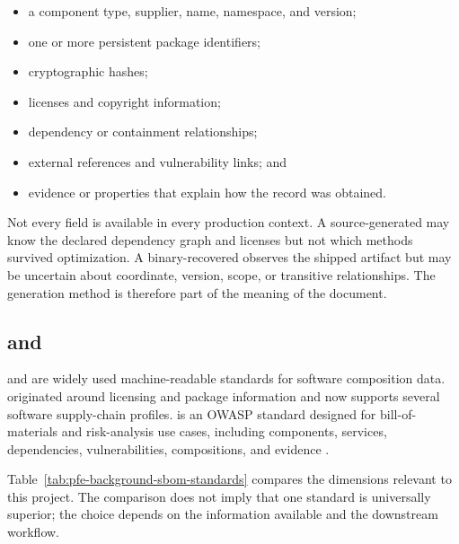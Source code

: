 \begin{itemize}
  \item a component type, supplier, name, namespace, and version;
  \item one or more persistent package identifiers;
  \item cryptographic hashes;
  \item licenses and copyright information;
  \item dependency or containment relationships;
  \item external references and vulnerability links; and
  \item evidence or properties that explain how the record was obtained.
\end{itemize}

Not every field is available in every production context. A source-generated
\SBOM may know the declared dependency graph and licenses but not which methods
survived optimization. A binary-recovered \SBOM observes the shipped artifact
but may be uncertain about coordinate, version, scope, or transitive
relationships. The generation method is therefore part of the meaning of the
document.

\subsection{\SPDX and \CycloneDX}

\SPDX and \CycloneDX are widely used machine-readable standards for software
composition data. \SPDX originated around licensing and package information
and now supports several software supply-chain profiles. \CycloneDX is an
OWASP standard designed for bill-of-materials and risk-analysis use cases,
including components, services, dependencies, vulnerabilities, compositions,
and evidence \cite{spdxSpecification,cyclonedxSpecification}.

Table~\ref{tab:pfe-background-sbom-standards} compares the dimensions relevant
to this project. The comparison does not imply that one standard is universally
superior; the choice depends on the information available and the downstream
workflow.

